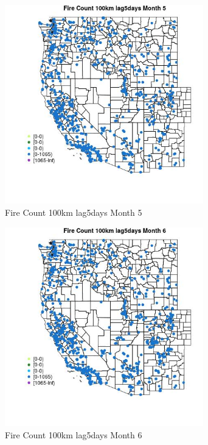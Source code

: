 \begin{figure} 
\centering  
\includegraphics[width=0.77\textwidth]{Code_Outputs/Report_ML_input_PM25_Step4_part_f_de_duplicated_aves_prioritize_24hr_obswNAs_MapObsMo5Fire_Count_100km_lag5days.jpg} 
\caption{\label{fig:Report_ML_input_PM25_Step4_part_f_de_duplicated_aves_prioritize_24hr_obswNAsMapObsMo5Fire_Count_100km_lag5days}Fire Count 100km lag5days Month 5} 
\end{figure} 
 

\begin{figure} 
\centering  
\includegraphics[width=0.77\textwidth]{Code_Outputs/Report_ML_input_PM25_Step4_part_f_de_duplicated_aves_prioritize_24hr_obswNAs_MapObsMo6Fire_Count_100km_lag5days.jpg} 
\caption{\label{fig:Report_ML_input_PM25_Step4_part_f_de_duplicated_aves_prioritize_24hr_obswNAsMapObsMo6Fire_Count_100km_lag5days}Fire Count 100km lag5days Month 6} 
\end{figure} 
 

